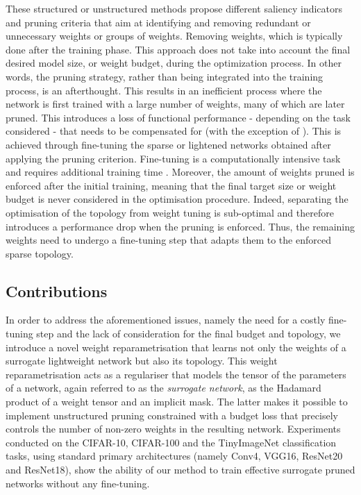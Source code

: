 These structured or unstructured methods propose different saliency indicators
and pruning criteria that aim at identifying and removing redundant or
unnecessary weights or groups of weights. Removing weights, which is typically
done after the training phase. This approach does not take into account the
final desired model size, or weight budget, during the optimization process. In
other words, the pruning strategy, rather than being integrated into the
training process, is an afterthought. This results in an inefficient process
where the network is first trained with a large number of weights, many of which
are later pruned. This introduces a loss of functional performance - depending
on the task considered - that needs to be compensated for (with the exception of
\cite{DBLP:conf/icml/KangH20,DBLP:conf/nips/HassibiS92}). This is achieved
through fine-tuning the sparse or lightened networks obtained after applying the
pruning criterion. Fine-tuning is a computationally intensive task and requires
additional training time
\cite{DBLP:conf/nips/HanPTD15,DBLP:journals/corr/HanMD15}. Moreover, the amount
of weights pruned is enforced after the initial training, meaning that the final
target size or weight budget is never considered in the optimisation procedure.
Indeed, separating the optimisation of the topology from weight tuning is
sub-optimal and therefore introduces a performance drop when the pruning is
enforced. Thus, the remaining weights need to undergo a fine-tuning step that
adapts them to the enforced sparse topology. \\

\subsection{Contributions}

In order to address the aforementioned issues, namely the need for a costly
fine-tuning step and the lack of consideration for the final budget and
topology, we introduce a novel weight reparametrisation that learns not only the
weights of a surrogate lightweight network but also its topology. This weight
reparametrisation acts as a regulariser that models the tensor of the parameters
of a network, again referred to as the \textit{surrogate network}, as the
Hadamard product of a weight tensor and an implicit mask. The latter makes it
possible to implement unstructured pruning constrained with a budget loss that
precisely controls the number of non-zero weights in the resulting network.
Experiments conducted on the CIFAR-10, CIFAR-100 and the TinyImageNet
classification tasks, using standard primary architectures (namely Conv4, VGG16,
ResNet20 and ResNet18), show the ability of our method to train effective
surrogate pruned networks without any fine-tuning.\\

